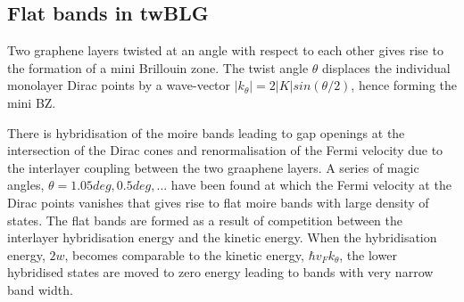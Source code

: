\subsection{Flat bands in twBLG}
Two graphene layers twisted at an angle with respect to each other gives rise to the formation of a mini Brillouin zone. The twist angle $\theta$ displaces the individual monolayer Dirac points by a wave-vector $|k_\theta|=2|K|sin(\theta/2)$, hence forming the mini BZ.

There is hybridisation of the moire bands leading to gap openings at the intersection of the Dirac cones and renormalisation of the Fermi velocity due to the interlayer coupling between the two graaphene layers. A series of magic angles, $\theta=1.05 deg, 0.5 deg, ...$ have been found at which the Fermi velocity at the Dirac points vanishes that gives rise to flat moire bands with large density of states. The flat bands are formed as a result of competition between the interlayer hybridisation energy and the kinetic energy. When the hybridisation energy, $2w$, becomes comparable to the kinetic energy, $\hbar v_Fk_\theta$, the lower hybridised states are moved to zero energy leading to bands with very narrow band width.
